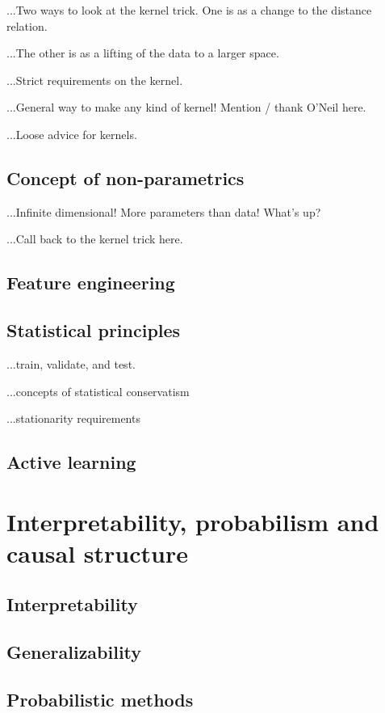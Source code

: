 \documentclass[12pt, twoside, letterpaper]{article}
\begin{document}
...Two ways to look at the kernel trick. One is as a change to the distance relation.

...The other is as a lifting of the data to a larger space.

...Strict requirements on the kernel.

...General way to make any kind of kernel! Mention / thank O'Neil here.

...Loose advice for kernels.

\subsection{Concept of non-parametrics}

...Infinite dimensional! More parameters than data! What's up?

...Call back to the kernel trick here.

\subsection{Feature engineering}

\subsection{Statistical principles}

...train, validate, and test.

...concepts of statistical conservatism

...stationarity requirements

\subsection{Active learning}

\section{Interpretability, probabilism and causal structure}

\subsection{Interpretability}

\subsection{Generalizability}

\subsection{Probabilistic methods}
\end{document}
